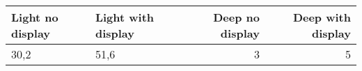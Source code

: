 \begin{tabular}{llrr}
\toprule
Light no display & Light with display &  Deep no display &  Deep with display \\
\midrule
            30,2 &               51,6 &                3 &                  5 \\
\bottomrule
\end{tabular}
